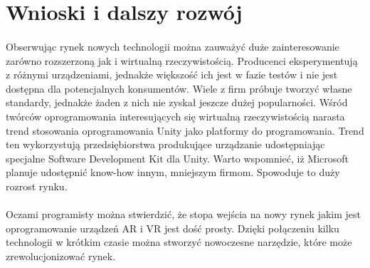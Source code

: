 \newpage
\section{Wnioski i dalszy rozwój}
\paragraph{}
Obserwując rynek nowych technologii można zauważyć duże zainteresowanie zarówno rozszerzoną jak i wirtualną rzeczywistością. Producenci eksperymentują z różnymi urządzeniami, jednakże większość ich jest w fazie testów i nie jest dostępna dla potencjalnych konsumentów.
Wiele z firm próbuje tworzyć własne standardy, jednakże żaden z nich nie zyskał jeszcze dużej popularności.
Wśród twórców oprogramowania interesujących się wirtualną rzeczywistością narasta trend stosowania oprogramowania Unity jako platformy do programowania. Trend ten wykorzystują przedsiębiorstwa produkujące urządzanie udostępniając specjalne Software Development Kit dla Unity. Warto wspomnieć, iż Microsoft planuje udostępnić know-how innym, mniejszym firmom\cite{holo}. Spowoduje to duży rozrost rynku.

\paragraph{}
Oczami programisty można stwierdzić, że stopa wejścia na nowy rynek jakim jest oprogramowanie urządzeń AR i VR jest dość prosty. Dzięki połączeniu kilku technologii w krótkim czasie można stworzyć nowoczesne narzędzie, które może zrewolucjonizować rynek.
